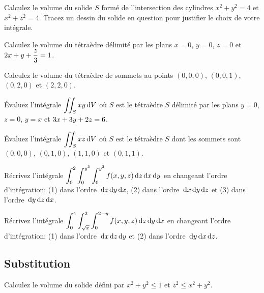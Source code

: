 \begin{question}
Calculez le volume du solide $S$ formé de l'intersection des cylindres
$x^2+y^2=4$ et $x^2+z^2=4$.
Tracez un dessin du solide en question pour justifier le choix de
votre intégrale.
\label{16Q11}
\end{question}

\begin{question}
Calculez le volume du tétraèdre délimité par les plans $x=0$, $y=0$, $z=0$
et $\DS 2x+y+ \frac{z}{3}=1$.
\label{16Q12}
\end{question}

\begin{question}
Calculez le volume du tétraèdre de sommets au points $(0,0,0)$,
$(0,0,1)$, $(0,2,0)$ et $(2,2,0)$.
\label{16Q13}
\end{question}

\begin{question}
Évaluez l'intégrale $\DS \iint_S xy \dx{V}$ où $S$ est le tétraèdre
$S$ délimité par les plans $y=0$, $z=0$, $y=x$ et
$\DS 3x+ 3y+ 2z=6$.
\label{16Q14}
\end{question}

\begin{question}
Évaluez l'intégrale $\DS \iint_S xz \dx{V}$ où $S$ est le tétraèdre
$S$ dont les sommets sont $(0,0,0)$, $(0,1,0)$, $(1,1,0)$ et $(0,1,1)$.
\label{16Q15}
\end{question}

\begin{question}
Récrivez l'intégrale
$\DS \int_0^2 \int_0^{y^3} \int_0^{y^2} f(x,y,z) \dx{z}\dx{x}\dx{y}$
en changeant l'ordre d'intégration: (1) dans l'ordre $\dx{z}\dx{y}\dx{x}$,
(2) dans l'ordre $\dx{x}\dx{y}\dx{z}$ et (3)  dans l'ordre
$\dx{y}\dx{z}\dx{x}$. 
\label{16Q16}
\end{question}

\begin{question}
Récrivez l'intégrale
$\DS \int_{0}^{4} \int_{\sqrt{x}}^{2} \int_{0}^{2-y}
f(x,y,z) \dx{z}\dx{y}\dx{x}$ en changeant l'ordre d'intégration: (1)
dans l'ordre $\dx{x}\dx{z}\dx{y}$ et (2) dans l'ordre
$\dx{y}\dx{x}\dx{z}$.
\label{16Q17}
\end{question}

\subsection{Substitution}

\begin{question}
Calculez le volume du solide défini par $x^2 + y^2 \leq 1$ et
$z^2 \leq x^2 + y^2$.
\label{16Q18}
\end{question}

